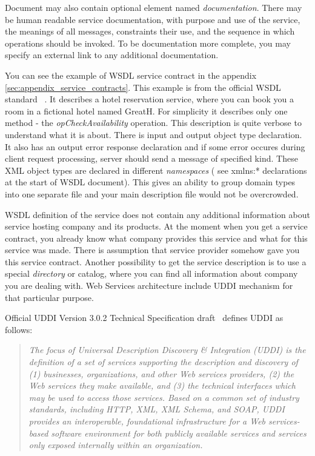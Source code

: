 

Document may also contain optional element named \textit{documentation}.
There may be human readable service documentation, with   purpose and use of the service, the meanings of all messages, constraints their use, and the sequence in which operations should be invoked.
To be documentation more complete, you may specify an external link to any additional documentation.


You can see the example of WSDL service contract in the appendix 
\autoref{sec:appendix_service_contracts}. This example is from the official
\gls{WSDL} standard ~\cite{wsdl_language_spec}. It describes a hotel reservation
service, where you can book you a room in a fictional hotel named GreatH. For simplicity it describes
only one method - the \textit{opCheckAvailability} operation. This description
is quite verbose to understand what it is about. There is input and output
object type declaration. It also has an output error response declaration and
if some error occures during client request processing, server should send a
message of specified kind.
These \gls{XML} object types are declared in different \textit{namespaces} ( see
xmlns:*	declarations at the start of \gls{WSDL} document). This gives an ability
to group domain types into one separate file and your main description
file would not be overcrowded.


\gls{WSDL} definition of the service does not contain any additional
information about service hosting company and its products. At the moment when
you get a service contract, you already know what company provides this service and what
for this service was made. There is assumption that service provider somehow
gave you this service contract. Another possibility to get the service
description is to use a special \textit{directory} or catalog, where you can
find all information about company you are dealing with. Web Services
architecture include \gls{UDDI} mechanism for that particular purpose.

Official \gls{UDDI} Version 3.0.2 Technical Specification draft~\cite{uddi_spec}
defines \gls{UDDI} as follows:
\begin{quotation}
\textit{
 The focus of Universal Description Discovery & Integration (UDDI) is the
definition of a set of services supporting the description and discovery of (1) businesses,
organizations, and other Web services providers, 
(2) the Web services they make available,
 and (3) the technical interfaces which may be used to access those services.
 Based on a common set of industry standards, including HTTP, XML, XML Schema, and SOAP,
 UDDI provides an interoperable, foundational infrastructure for a Web services-based software environment
 for both publicly available services and services only exposed internally within an organization.
}
\end{quotation}

